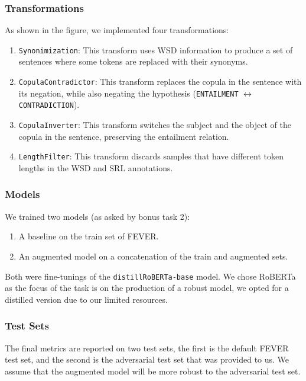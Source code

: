 \documentclass[english, xcolor={table,usenames}]{beamer}
\begin{document}
\begin{frame}
  \frametitle{Transformations}

  As shown in the figure, we implemented four transformations:

  \begin{enumerate}
    \item<1->


          \texttt{Synonimization}: This transform uses WSD information to produce a set of sentences where some tokens are replaced with their synonyms.
    \item<2-> \texttt{CopulaContradictor}: This transform replaces the copula in the sentence with its negation, while also negating the hypothesis (\texttt{ENTAILMENT} $\leftrightarrow$ \texttt{CONTRADICTION}).
    \item<3-> \texttt{CopulaInverter}: This transform switches the subject and the object of the copula in the sentence, preserving the entailment relation.
    \item<4-> \texttt{LengthFilter}: This transform discards samples that have different token lengths in the WSD and SRL annotations.
  \end{enumerate}



\end{frame}

\begin{frame}
  \frametitle{Models}

  We trained two models (as asked by bonus task 2):

  \begin{enumerate}
    \item A \alert{baseline} on the train set of FEVER.
    \item An \alert{augmented} model on a concatenation of the train and augmented sets.
  \end{enumerate}

  Both were fine-tunings of the \texttt{distillRoBERTa-base} model. We chose RoBERTa as
  the focus of the task is on the production of a robust model, we opted for a distilled
  version due to our limited resources.

\end{frame}

\begin{frame}
  \frametitle{Test Sets}

  The final metrics are reported on \alert{two} test sets, the first is the default
  FEVER test set, and the second is the \alert{adversarial} test set that was provided
  to us. We assume that the augmented model will be more \alert{robust} to the adversarial
  test set.

\end{frame}
\end{document}
